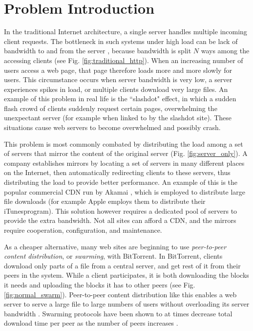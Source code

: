 \section {Problem Introduction}
In the traditional Internet architecture, a single server handles multiple incoming client requests.  The bottleneck in such systems under high load can be lack of bandwidth to and from the server \cite{coopnet}, because bandwidth is split $N$ ways among the accessing clients (see Fig. \ref{fig:traditional_http}).  When an increasing number of users access a web page, that page therefore loads more and more slowly for users.  This circumstance occurs when server bandwidth is very low, a server experiences spikes in load, or multiple clients download very large files.  An example of this problem in real life is the ``slashdot" effect, in which a sudden flash crowd of clients suddenly request certain pages, overwhelming the unexpectant server (for example when linked to by the slashdot site).  These situations cause web servers to become overwhelmed and possibly crash.

This problem is most commonly combated by distributing the load among a set of servers that mirror the content of the original server (Fig. \ref{fig:server_only}).  A company establishes mirrors by locating a set of servers in many different places on the Internet, then automatically redirecting clients to these servers, thus distributing the load to provide better performance.  An example of this is the popular commercial CDN run by Akamai \cite{akamai}, which is employed to distribute large file downloads (for example Apple employs them to distribute their iTunes\texttrademark program).  This solution however requires a dedicated pool of servers to provide the extra bandwidth.  Not all sites can afford a CDN, and the mirrors require cooperation, configuration, and maintenance.

As a cheaper alternative, many web sites are beginning to use \emph{peer-to-peer content distribution}, or \emph{swarming}, with BitTorrent.  In BitTorrent, clients download only parts of a file from a central server, and get rest of it from their peers in the system.  While a client participates, it is both downloading the blocks it needs and uploading the blocks it has to other peers (see Fig. \ref{fig:normal_swarm}).  Peer-to-peer content distribution like this enables a web server to serve a large file to large numbers of users without overloading its server bandwidth \cite{zappala}. Swarming protocols have been shown to at times decrease total download time per peer as the number of peers increases \cite{slurpie}. 

